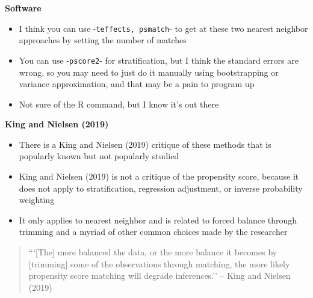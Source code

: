 \documentclass[notes=show]{beamer}
\begin{document}
\begin{frame}[plain]
\begin{center}
\textbf{Software}
\end{center}

\begin{itemize}
\item I think you can use -\texttt{teffects, psmatch}- to get at these two nearest neighbor approaches by setting the number of matches
\item You can use -\texttt{pscore2}- for stratification, but I think the standard errors are wrong, so you may need to just do it manually using bootstrapping or variance approximation, and that may be a pain to program up
\item Not sure of the R command, but I know it's out there
\end{itemize}

\end{frame}


\begin{frame}[plain]

	\begin{center}
	\textbf{King and Nielsen (2019)}
	\end{center}
	
	\begin{itemize}
	\item There is a King and Nielsen (2019) critique of these methods that is popularly known but not popularly studied
	\item King and Nielsen (2019) is not a critique of the propensity score, because it does not apply to stratification, regression adjustment, or inverse probability weighting
	\item It only applies to nearest neighbor and is related to forced balance through trimming and a myriad of other common choices made by the researcher
	\end{itemize}
	
\end{frame}

\begin{frame}[plain]

\begin{quote}
	

```[The] more balanced the data, or the more balance it becomes by [trimming] some of the observations through matching, the more likely propensity score matching will degrade inferences.'' -- King and Nielsen (2019)

\end{quote}
	
\end{frame}
\end{document}
